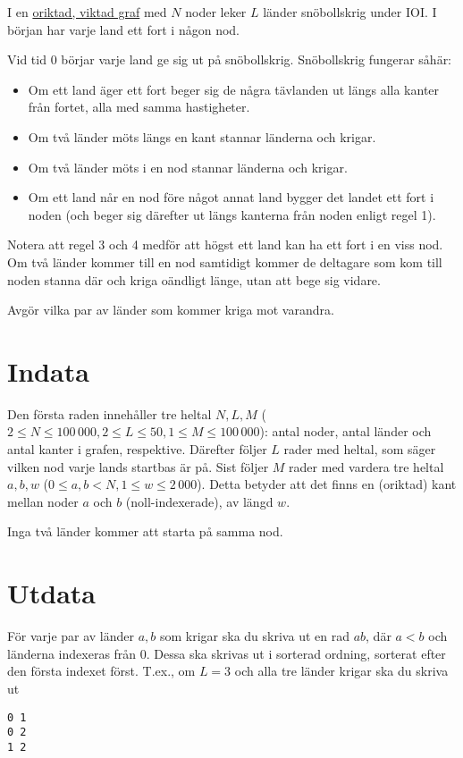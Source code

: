 
I en \href{https://sv.wikipedia.org/wiki/Graf_(grafteori)}{oriktad, viktad graf}
med $N$ noder leker $L$ länder snöbollskrig under IOI.
I början har varje land ett fort i någon nod.

Vid tid $0$ börjar varje land ge sig ut på snöbollskrig. Snöbollskrig fungerar såhär:

\begin{itemize}
\item Om ett land äger ett fort beger sig de några tävlanden ut längs alla kanter från fortet, alla med samma hastigheter.
\item Om två länder möts längs en kant stannar länderna och krigar.
\item Om två länder möts i en nod stannar länderna och krigar.
\item Om ett land når en nod före något annat land bygger det landet ett fort i noden (och beger sig därefter ut längs kanterna från noden enligt regel 1).
\end{itemize}

Notera att regel 3 och 4 medför att högst ett land kan ha ett fort i en viss nod.
Om två länder kommer till en nod samtidigt kommer de deltagare som kom till noden stanna där och kriga oändligt länge, utan att bege sig vidare.

Avgör vilka par av länder som kommer kriga mot varandra.

\section*{Indata}

Den första raden innehåller tre heltal $N,L,M$ ($2 \le N \le 100\,000, 2 \le L \le 50, 1 \le M \le 100\,000$):
antal noder, antal länder och antal kanter i grafen, respektive.
Därefter följer $L$ rader med heltal, som säger vilken nod varje lands startbas är på.
Sist följer $M$ rader med vardera tre heltal $a, b, w$ ($0 \le a,b < N, 1 \le w \le 2\,000$).
Detta betyder att det finns en (oriktad) kant mellan noder $a$ och $b$ (noll-indexerade), av längd $w$.

Inga två länder kommer att starta på samma nod.

\section*{Utdata}

För varje par av länder $a, b$ som krigar ska du skriva ut en rad $a b$, där $a < b$ och länderna indexeras från $0$.
Dessa ska skrivas ut i sorterad ordning, sorterat efter den första indexet först.
T.ex., om $L = 3$ och alla tre länder krigar ska du skriva ut
\begin{lstlisting}
0 1
0 2
1 2
\end{lstlisting}

